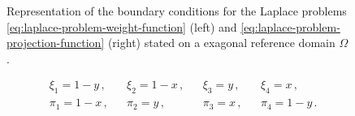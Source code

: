 \documentclass[12pt, a4paper, twoside, openright]{report}
\numberwithin{equation}{chapter}
\theoremstyle{theorem}
\theoremstyle{definition}
\theoremstyle{remark}
\theoremstyle{proposition}
\numberwithin{figure}{chapter}
\begin{document}
\begin{figure}[t]
\begin{minipage}{0.45\textwidth}
			\end{minipage}
			
			\caption{Representation of the boundary conditions for the Laplace problems \eqref{eq:laplace-problem-weight-function} (left) and \eqref{eq:laplace-problem-projection-function} (right) stated on a exagonal reference domain $\Omega$.}
			\label{fig:laplace-bc}
		\end{figure}
	
		\begin{equation}
			\label{eq:weight-projection-function}
			\begin{aligned}
				& \xi_1 = 1 - y \, , && \xi_2 = 1 - x \, , && \xi_3 = y \, , && \xi_4 = x \, , \\
				& \pi_1 = 1 - x \, , && \pi_2 = y \, , && \pi_3 = x \, , && \pi_4 = 1 - y \, .
			\end{aligned}
		\end{equation}
		
\end{document}
